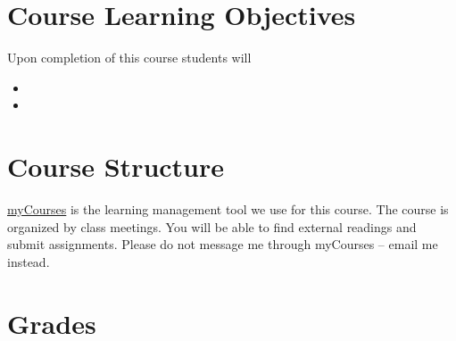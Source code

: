 \documentclass[
  letterpaper,
  DIV=11,
  numbers=noendperiod]{scrreprt}
\providecommand{\tightlist}{%
  \setlength{\itemsep}{0pt}\setlength{\parskip}{0pt}}\usepackage{longtable,booktabs,array}
\begin{document}
\hypertarget{course-learning-objectives}{%
\section*{Course Learning Objectives}\label{course-learning-objectives}}


Upon completion of this course students will

\begin{itemize}
\tightlist
\item
\item
\end{itemize}

\hypertarget{course-structure}{%
\section*{Course Structure}\label{course-structure}}


\href{https://my.unh.edu/canvas}{myCourses} is the learning management
tool we use for this course. The course is organized by class meetings.
You will be able to find external readings and submit assignments.
Please do not message me through myCourses -- email me instead.

\hypertarget{grades}{%
\section*{Grades}\label{grades}}

\end{document}
